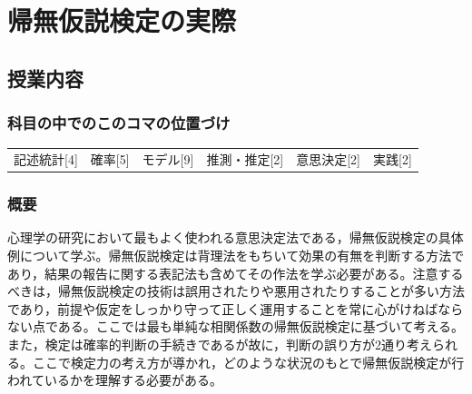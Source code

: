 \section{帰無仮説検定の実際}
\label{lesson18}
\subsection{授業内容}
\subsubsection{科目の中でのこのコマの位置づけ}
\begin{tabular}[t]{cccccc}
    記述統計[4] & 確率[5] & モデル[9] & 推測・推定[2] & 意思決定[2] & 実践[2]
\end{tabular}
\subsubsection{概要}
心理学の研究において最もよく使われる意思決定法である，帰無仮説検定の具体例について学ぶ。帰無仮説検定は背理法をもちいて効果の有無を判断する方法であり，結果の報告に関する表記法も含めてその作法を学ぶ必要がある。注意するべきは，帰無仮説検定の技術は誤用されたりや悪用されたりすることが多い方法であり，前提や仮定をしっかり守って正しく運用することを常に心がけねばならない点である。ここでは最も単純な相関係数の帰無仮説検定に基づいて考える。また，検定は確率的判断の手続きであるが故に，判断の誤り方が2通り考えられる。ここで検定力の考え方が導かれ，どのような状況のもとで帰無仮説検定が行われているかを理解する必要がある。
